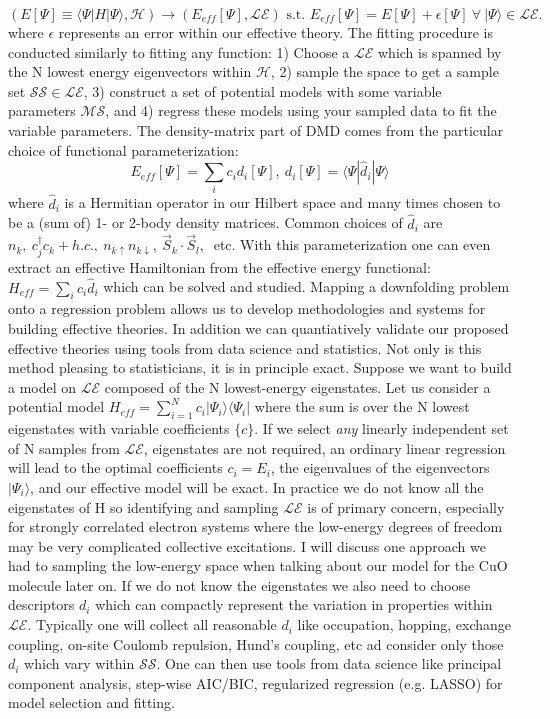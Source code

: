 \documentclass{article}
\begin{document}
\begin{equation}
(E[\Psi] \equiv \langle \Psi | H |\Psi \rangle, \mathcal{H}) \rightarrow (E_{eff}[\Psi], \mathcal{LE})\text{ s.t. } E_{eff}[\Psi] = E[\Psi] + \epsilon[\Psi] \ \forall \ |\Psi\rangle \in \mathcal{LE}.
\label{DMD}
\end{equation}
where $\epsilon$ represents an error within our effective theory. The fitting procedure is conducted similarly to fitting any function: 1) Choose a $\mathcal{LE}$ which is spanned by the N lowest energy eigenvectors within $\mathcal{H}$, 2) sample the space to get a sample set $\mathcal{SS} \in \mathcal{LE}$, 3) construct a set of potential models with some variable parameters $\mathcal{MS}$, and 4) regress these models using your sampled data to fit the variable parameters. The density-matrix part of DMD comes from the particular choice of functional parameterization: 
\begin{equation}
E_{eff}[\Psi] = \sum_i c_i d_i[\Psi],\ d_i[\Psi] = \langle \Psi |\hat{d}_i|\Psi \rangle
\end{equation}
where $\hat{d}_i$ is a Hermitian operator in our Hilbert space and many times chosen to be a (sum of) 1- or 2-body density matrices. Common choices of $\hat{d}_i$ are $n_k,\ c_j^\dagger c_k + h.c.,\ n_{k\uparrow}n_{k\downarrow},\ \vec{S}_k \cdot \vec{S}_l,\ $ etc. With this parameterization one can even extract an effective Hamiltonian from the effective energy functional: $H_{eff} = \sum_i c_i \hat{d}_i$ which can be solved and studied. Mapping a downfolding problem onto a regression problem allows us to develop methodologies and systems for building effective theories. In addition we can quantiatively validate our proposed effective theories using tools from data science and statistics. Not only is this method pleasing to statisticians, it is in principle exact. Suppose we want to build a model on $\mathcal{LE}$ composed of the N lowest-energy eigenstates. Let us consider a potential model $H_{eff} = \sum_{i=1}^{ N} c_i |\Psi_i\rangle \langle \Psi_i|$ where the sum is over the N lowest eigenstates with variable coefficients $\{c\}$. If we select \textit{any} linearly independent set of N samples from $\mathcal{LE}$, eigenstates are not required, an ordinary linear regression will lead to the optimal coefficients $c_i = E_i$, the eigenvalues of the eigenvectors $|\Psi_i\rangle$, and our effective model will be exact. In practice we do not know all the eigenstates of H so identifying and sampling $\mathcal{LE}$ is of primary concern, especially for strongly correlated electron systems where the low-energy degrees of freedom may be very complicated collective excitations. I will discuss one approach we had to sampling the low-energy space when talking about our model for the CuO molecule later on. If we do not know the eigenstates we also need to choose descriptors $d_i$ which can compactly represent the variation in properties within $\mathcal{LE}$. Typically one will collect all reasonable $d_i$ like occupation, hopping, exchange coupling, on-site Coulomb repulsion, Hund's coupling, etc ad consider only those $d_i$ which vary within $\mathcal{SS}$. One can then use tools from data science like principal component analysis, step-wise AIC/BIC, regularized regression (e.g. LASSO) for model selection and fitting. 
\end{document}
